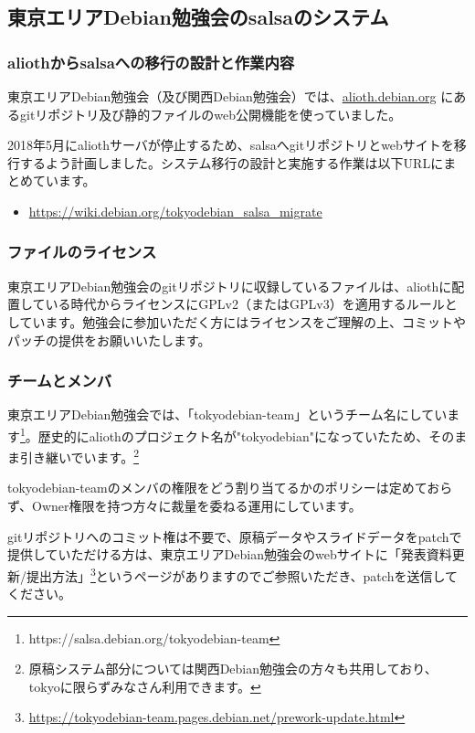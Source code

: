 \documentclass[mingoth,a4paper]{jsarticle}
\begin{document}
\subsection{東京エリアDebian勉強会のsalsaのシステム}

\subsubsection{aliothからsalsaへの移行の設計と作業内容}

東京エリアDebian勉強会（及び関西Debian勉強会）では、\url{alioth.debian.org} にあるgitリポジトリ及び静的ファイルのweb公開機能を使っていました。

2018年5月にaliothサーバが停止するため、salsaへgitリポジトリとwebサイトを移行するよう計画しました。システム移行の設計と実施する作業は以下URLにまとめています。

\begin{itemize}
  \item \url{https://wiki.debian.org/tokyodebian_salsa_migrate}
\end{itemize}


\subsubsection{ファイルのライセンス}

東京エリアDebian勉強会のgitリポジトリに収録しているファイルは、aliothに配置している時代からライセンスにGPLv2（またはGPLv3）を適用するルールとしています。勉強会に参加いただく方にはライセンスをご理解の上、コミットやパッチの提供をお願いいたします。


\subsubsection{チームとメンバ}

東京エリアDebian勉強会では、「tokyodebian-team」というチーム名にしています\footnote{https://salsa.debian.org/tokyodebian-team}。歴史的にaliothのプロジェクト名が"tokyodebian"になっていたため、そのまま引き継いでいます。\footnote{原稿システム部分については関西Debian勉強会の方々も共用しており、tokyoに限らずみなさん利用できます。}


tokyodebian-teamのメンバの権限をどう割り当てるかのポリシーは定めておらず、Owner権限を持つ方々に裁量を委ねる運用にしています。


gitリポジトリへのコミット権は不要で、原稿データやスライドデータをpatchで提供していただける方は、東京エリアDebian勉強会のwebサイトに「発表資料更新/提出方法」\footnote{\url{https://tokyodebian-team.pages.debian.net/prework-update.html}}というページがありますのでご参照いただき、patchを送信してください。
\end{document}
